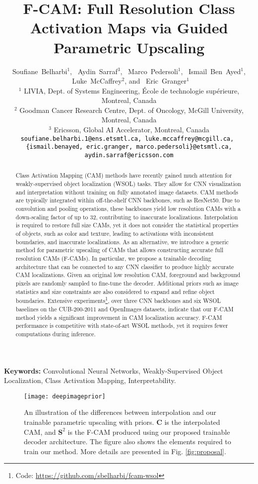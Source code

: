 \documentclass[twocolumn]{article}
\title{F-CAM: Full Resolution Class Activation Maps  via Guided Parametric Upscaling}
\author{Soufiane~Belharbi$^{1}$,
  ~Aydin~Sarraf$^{3}$,
  ~Marco~Pedersoli$^{1}$,
  ~Ismail~Ben~Ayed$^{1}$,
  ~Luke~McCaffrey$^{2}$, and
  ~Eric~Granger$^{1}$\\
$^1$ LIVIA, Dept. of Systems Engineering, École de technologie supérieure, Montreal, Canada \\
	$^2$ Goodman Cancer Research Centre, Dept. of Oncology, McGill University, Montreal, Canada\\
  $^3$ Ericsson,  Global AI Accelerator, Montreal, Canada\\
{\tt\footnotesize \textcolor{black}{soufiane.belharbi.1@ens.etsmtl.ca, luke.mccaffrey@mcgill.ca}, }\\
{\tt\footnotesize \textcolor{black}{\{ismail.benayed, eric.granger, marco.pedersoli\}@etsmtl.ca}, {\tt\footnotesize \textcolor{black}{aydin.sarraf@ericsson.com}}}
}
\theoremstyle{definition}
\begin{document}
\maketitle\thispagestyle{fancy}

\maketitle


\begin{abstract}
  Class Activation Mapping (CAM) methods have recently gained much attention for weakly-supervised object localization (WSOL) tasks. They allow for CNN visualization and interpretation without training on fully annotated image datasets. CAM methods are typically integrated within off-the-shelf CNN backbones, such as ResNet50. Due to convolution and pooling operations, these backbones yield low resolution CAMs with a down-scaling factor of up to 32, contributing to inaccurate localizations. Interpolation is required to restore full size CAMs, yet it does not consider the statistical properties of objects, such as color and texture, leading to activations with inconsistent boundaries, and inaccurate localizations.
As an alternative, we introduce a generic method for parametric upscaling of CAMs that allows constructing accurate full resolution CAMs (F-CAMs). In particular, we propose a trainable decoding architecture that can be connected to any CNN classifier to produce highly accurate CAM localizations. Given an original low resolution CAM, foreground and background pixels are randomly sampled to fine-tune the decoder. Additional priors such as image statistics and size constraints are also considered to expand and refine object boundaries.
Extensive experiments\footnote{{\small Code: \textcolor{red}{ \href{https://github.com/sbelharbi/fcam-wsol}{https://github.com/sbelharbi/fcam-wsol}}}}, over three CNN backbones and six WSOL baselines on the CUB-200-2011 and OpenImages datasets, indicate that our F-CAM method yields a significant improvement in CAM localization accuracy. F-CAM performance is competitive with state-of-art WSOL methods, yet it requires fewer computations during inference.
\end{abstract}

\textbf{Keywords:} Convolutional Neural Networks, Weakly-Supervised Object Localization, Class Activation Mapping, Interpretability.



\begin{figure}[ht!]
\centering
  \centering
  \texttt{[image: deepimageprior]}
  \caption{An illustration of the differences between interpolation and our trainable parametric upscaling with priors. ${\bm{C}}$ is the interpolated CAM, and ${\bm{S}^2}$ is the F-CAM produced using our proposed trainable decoder architecture. The figure also shows the elements required to train our method. More details are presented in Fig. \ref{fig:proposal}.}
  \label{fig:intuition}
\end{figure}
\end{document}
